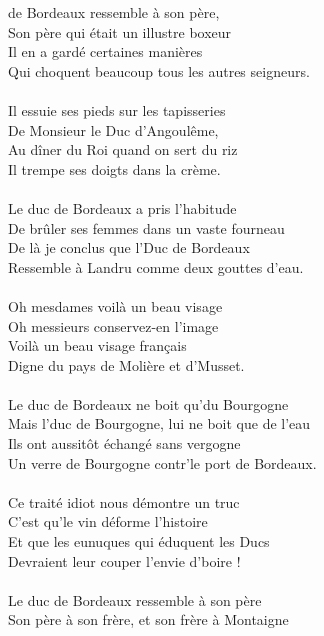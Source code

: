 
 de Bordeaux ressemble à son père,
\\Son père qui était un illustre boxeur
\\Il en a gardé certaines manières
\\Qui choquent beaucoup tous les autres seigneurs.
\\\\Il essuie ses pieds sur les tapisseries
\\De Monsieur le Duc d'Angoulême,
\\Au dîner du Roi quand on sert du riz
\\Il trempe ses doigts dans la crème.
\\\\Le duc de Bordeaux a pris l'habitude
\\De brûler ses femmes dans un vaste fourneau
\\De là je conclus que l'Duc de Bordeaux
\\Ressemble à Landru comme deux gouttes d'eau.
\\\\Oh mesdames voilà un beau visage
\\Oh messieurs conservez-en l'image
\\Voilà un beau visage français
\\Digne du pays de Molière et d'Musset.
\\\\Le duc de Bordeaux ne boit qu'du Bourgogne
\\Mais l'duc de Bourgogne, lui ne boit que de l'eau
\\Ils ont aussitôt échangé sans vergogne
\\Un verre de Bourgogne contr'le port de Bordeaux.
\\\\Ce traité idiot nous démontre un truc
\\C'est qu'le vin déforme l'histoire
\\Et que les eunuques qui éduquent les Ducs
\\Devraient leur couper l'envie d'boire !
\\\\Le duc de Bordeaux ressemble à son père
\\Son père à son frère, et son frère à Montaigne

